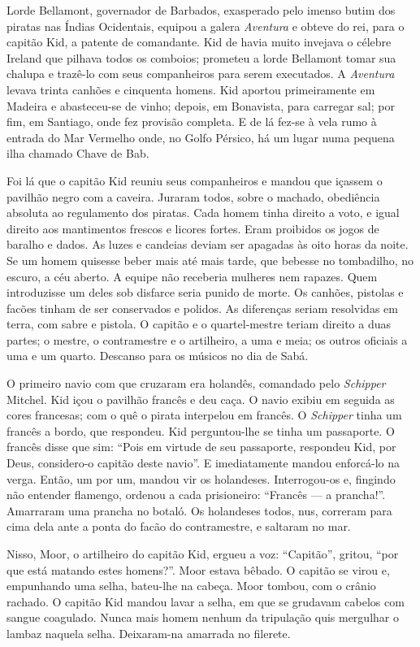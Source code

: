 Lorde Bellamont, governador de Barbados, exasperado pelo imenso butim dos
piratas nas Índias Ocidentais, equipou a galera \textit{Aventura} e obteve
do rei, para o capitão Kid, a patente de comandante. Kid de havia muito
invejava o célebre Ireland que pilhava todos os comboios; prometeu a lorde
Bellamont tomar sua chalupa e trazê-lo com seus companheiros para serem
executados. A \textit{Aventura} levava trinta canhões e cinquenta homens.
Kid aportou primeiramente em Madeira e abasteceu-se de vinho; depois, em
Bonavista, para carregar sal; por fim, em Santiago, onde fez provisão
completa. E de lá fez-se à vela rumo à entrada do Mar Vermelho onde, no
Golfo Pérsico, há um lugar numa pequena ilha chamado Chave de Bab.

Foi lá que o capitão Kid reuniu seus companheiros e mandou que içassem o
pavilhão negro com a caveira. Juraram todos, sobre o machado, obediência
absoluta ao regulamento dos piratas. Cada homem tinha direito a voto, e
igual direito aos mantimentos frescos e licores fortes. Eram proibidos os
jogos de baralho e dados. As luzes e candeias deviam ser apagadas às oito
horas da noite. Se um homem quisesse beber mais até mais tarde, que
bebesse no tombadilho, no escuro, a céu aberto. A equipe não receberia
mulheres nem rapazes. Quem introduzisse um deles sob disfarce seria punido
de morte. Os canhões, pistolas e facões tinham de ser conservados e
polidos. As diferenças seriam resolvidas em terra, com sabre e pistola. O
capitão e o quartel-mestre teriam direito a duas partes; o mestre, o
contramestre e o artilheiro, a uma e meia; os outros oficiais a uma e um
quarto. Descanso para os músicos no dia de Sabá.

O primeiro navio com que cruzaram era holandês, comandado pelo
\textit{Schipper} Mitchel. Kid içou o pavilhão francês e deu caça. O navio
exibiu em seguida as cores francesas; com o quê o pirata interpelou em
francês. O \textit{Schipper} tinha um francês a bordo, que respondeu. Kid
perguntou-lhe se tinha um passaporte. O francês disse que sim: “Pois em
virtude de seu passaporte, respondeu Kid, por Deus, considero-o capitão
deste navio”. E imediatamente mandou enforcá-lo na verga. Então, um por
um, mandou vir os holandeses. Interrogou-os e, fingindo não entender
flamengo, ordenou a cada prisioneiro: “Francês --- a prancha!”. Amarraram uma
prancha no botaló. Os holandeses todos, nus, correram para cima dela ante
a ponta do facão do contramestre, e saltaram no mar.

Nisso, Moor, o artilheiro do capitão Kid, ergueu a voz: “Capitão'', gritou,
``por que está matando estes homens?”. Moor estava bêbado. O capitão se virou
e, empunhando uma selha, bateu-lhe na cabeça. Moor tombou, com o crânio
rachado. O capitão Kid mandou lavar a selha, em que se grudavam cabelos
com sangue coagulado. Nunca mais homem nenhum da tripulação quis mergulhar
o lambaz naquela selha. Deixaram-na amarrada no filerete.

